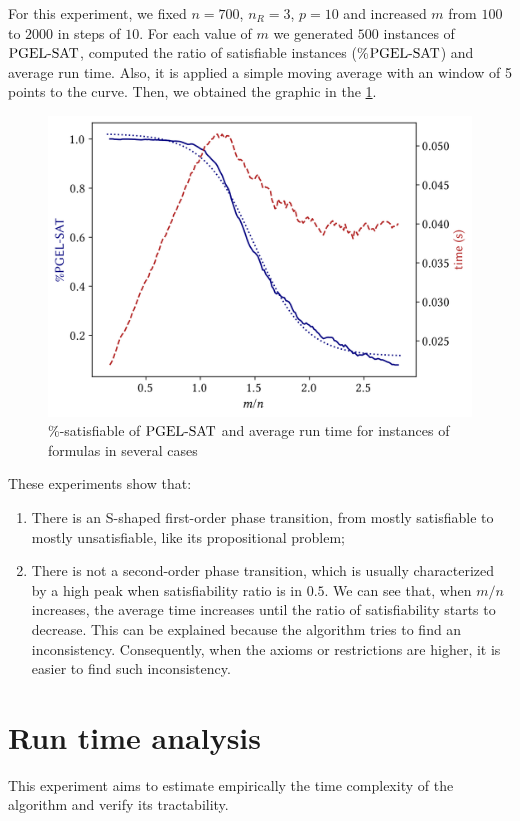 For this experiment, we fixed $n = 700$, $n_R = 3$, $p = 10$ and increased $m$ from $100$ to $2000$ in steps of $10$. For each value of $m$ we generated $500$ instances of $\text{PGEL-SAT}$, computed the ratio of satisfiable instances (\%$\text{PGEL-SAT}$) and average run time. Also, it is applied a simple moving average with an window of 5 points to the curve.  Then, we obtained the graphic in the \cref{fig:plot-phase}.

\begin{figure}[ht]
  \centering
  \includegraphics[width=.75\textwidth]{../img/plot-phase-trans}
  \caption{\%-satisfiable of $\text{PGEL-SAT}$ and average run time for instances of formulas in several cases}
  \label{fig:plot-phase}
\end{figure}
  

These experiments show that:
\begin{enumerate}[label=(\alph*)]
	\item There is an S-shaped first-order phase transition, from mostly satisfiable to mostly unsatisfiable, like its propositional problem;
	\item There is not a second-order phase transition, which is usually characterized by a high peak when satisfiability ratio is in $0.5$. We can see that, when $m/n$ increases, the average time increases until the ratio of satisfiability starts to decrease. This can be explained because the algorithm tries to find an inconsistency. Consequently, when the axioms or restrictions are higher, it is easier to find such inconsistency.
\end{enumerate}

\section{Run time analysis}

This experiment aims to estimate empirically the time complexity of the algorithm and verify its tractability.

